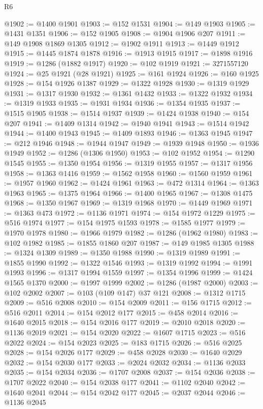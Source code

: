 \begin{lexlean}{R6}
\begin{coremodule}
@1902 := @1400 @1901
@1903 := @152 @1531
@1904 := @149 @1903
@1905 := @1431 @1351
@1906 := @152 @1905
@1908 := @1904 @1906 @207
@1911 := @149 @1908 @1869 @1305
@1912 := @1902 @1911
@1913 := @1449 @1912
@1915 := @1445 @1874 @1878
@1916 := @1913 @1915
@1917 := @1898 @1916
@1919 := @1286 (@1882 @1917)
@1920 := @102 @1919
@1921 := 3271557120
@1924 := @25 @1921 (@28 @1921)
@1925 := @161 @1924
@1926 := @160 @1925
@1928 := @154 @1926 @1387
@1929 := @1322 @1928
@1930 := @1319 @1929
@1931 := @1317 @1930
@1932 := @1361 @1432
@1933 := @1322 @1932
@1934 := @1319 @1933
@1935 := @1931 @1934
@1936 := @1354 @1935
@1937 := @1515 @1905
@1938 := @1514 @1937
@1939 := @1424 @1938
@1940 := @154 @207
@1941 := @1409 @1314
@1942 := @1940 @1941
@1943 := @1514 @1942
@1944 := @1400 @1943
@1945 := @1409 @1893
@1946 := @1363 @1945
@1947 := @212 @1946
@1948 := @1944 @1947
@1949 := @1939 @1948
@1950 := @1936 @1949
@1952 := @1286 (@1306 @1950)
@1953 := @102 @1952
@1954 := @1290 @1545
@1955 := @1350 @1954
@1956 := @1319 @1955
@1957 := @1317 @1956
@1958 := @1363 @1416
@1959 := @1562 @1958
@1960 := @1560 @1959
@1961 := @1957 @1960
@1962 := @1424 @1961
@1963 := @472 @1314
@1964 := @1363 @1963
@1965 := @1375 @1964
@1966 := @1400 @1965
@1967 := @1308 @1475
@1968 := @1350 @1967
@1969 := @1319 @1968
@1970 := @1449 @1969
@1971 := @1363 @473
@1972 := @1136 @1971
@1974 := @154 @1972 @1229
@1975 := @516 @1974
@1977 := @154 @1975 @1593
@1978 := @1585 @1977
@1979 := @1970 @1978
@1980 := @1966 @1979
@1982 := @1286 (@1962 @1980)
@1983 := @102 @1982
@1985 := @1855 @1860 @207
@1987 := @149 @1985 @1305
@1988 := @1324 @1309
@1989 := @1350 @1988
@1990 := @1319 @1989
@1991 := @1855 @1990
@1992 := @1322 @1546
@1993 := @1319 @1992
@1994 := @1991 @1993
@1996 := @1317 @1994 @1559
@1997 := @1354 @1996
@1999 := @1424 @1565 @1370
@2000 := @1997 @1999
@2002 := @1286 (@1987 @2000)
@2003 := @102 @2002
@2007 := @103 (@109 @147) @37 @121
@2008 := @1312 @1715
@2009 := @516 @2008
@2010 := @154 @2009
@2011 := @156 @1715
@2012 := @516 @2011
@2014 := @154 @2012 @177
@2015 := @458 @2014
@2016 := @1640 @2015
@2018 := @154 @2016 @177
@2019 := @2010 @2018
@2020 := @1136 @2019
@2021 := @154 @2020
@2022 := @1607 @1715
@2023 := @516 @2022
@2024 := @154 @2023
@2025 := @183 @1715
@2026 := @516 @2025
@2028 := @154 @2026 @177
@2029 := @458 @2028
@2030 := @1640 @2029
@2032 := @154 @2030 @177
@2033 := @2024 @2032
@2034 := @1136 @2033
@2035 := @154 @2034
@2036 := @1707 @2008
@2037 := @154 @2036
@2038 := @1707 @2022
@2040 := @154 @2038 @177
@2041 := @1102 @2040
@2042 := @1640 @2041
@2044 := @154 @2042 @177
@2045 := @2037 @2044
@2046 := @1136 @2045

\end{coremodule}
\end{lexlean}
